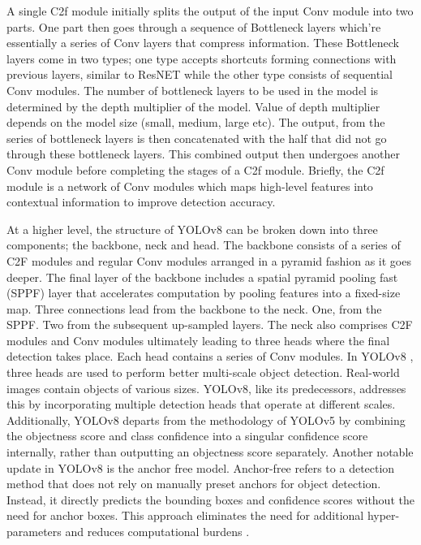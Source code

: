 A single C2f module initially splits the output of the input Conv module into two parts. One part then goes through a sequence of Bottleneck layers which're essentially a series of Conv layers that compress information. These Bottleneck layers come in two types; one type accepts shortcuts forming connections with previous layers, similar to ResNET\cite{targ2016resnet} while the other type consists of sequential Conv modules. The number of bottleneck layers to be used in the model is determined by the depth multiplier of the model. Value of depth multiplier depends on the model size (small, medium, large etc). The output, from the series of bottleneck layers is then concatenated with the half that did not go through these bottleneck layers. This combined output then undergoes another Conv module before completing the stages of a C2f module. Briefly, the C2f module is a network of Conv modules which maps high-level features into contextual information to improve detection accuracy\cite{mmyolo2023}.


At a higher level, the structure of YOLOv8 can be broken down into three components; the backbone, neck and head. The backbone consists of a series of C2F modules and regular Conv modules arranged in a pyramid fashion as it goes deeper. The final layer of the backbone includes a spatial pyramid pooling fast (SPPF) layer that accelerates computation by pooling features into a fixed-size map. Three connections lead from the backbone to the neck. One, from the SPPF. Two from the subsequent up-sampled layers. The neck also comprises C2F modules and Conv modules ultimately leading to three heads where the final detection takes place. Each head contains a series of Conv modules. %
In YOLOv8 , three heads are used to perform better multi-scale object detection. Real-world images contain objects of various sizes. YOLOv8, like its predecessors, addresses this by incorporating multiple detection heads that operate at different scales.  Additionally, YOLOv8 departs from the methodology of YOLOv5 by combining the objectness score and class confidence into a singular confidence score internally, rather than outputting an objectness score separately. Another notable update in YOLOv8 is the anchor free model. Anchor-free refers to a detection method that does not rely on manually preset anchors for object detection. Instead, it directly predicts the bounding boxes and confidence scores without the need for anchor boxes. This approach eliminates the need for additional hyper-parameters and reduces computational burdens \cite{law2018cornernet,duan2019centernet,tian2019fcos}.

